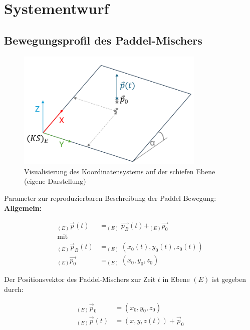 \chapter{Systementwurf}

\section{Bewegungsprofil des Paddel-Mischers}

\begin{figure}[h]
    \centering
    \includegraphics[width=0.8\textwidth]{bilder/KS_E-Koordinatensystem_Ebene.png}
    \caption[Visualisierung des Koordinatensystems auf der schiefen Ebene]{Visualisierung des Koordinatensystems auf der schiefen Ebene (eigene Darstellung)}\label{fig:VisualisierungKoordinatensystemSchiefe}
\end{figure}

Parameter zur reproduzierbaren Beschreibung der Paddel Bewegung:\\

\textbf{Allgemein:}


\begin{equation}
    \begin{aligned}
        _{(E)}\vec{p}(t) &= _{(E)}\vec{p_B}(t) + _{(E)}\vec{p_0}\\
        \text{mit}\\
        _{(E)}\vec{p}_B(t) &= _{(E)}\left(x_0(t), y_0(t), z_0(t)\right)\\
        _{(E)}\vec{p_0} &= _{(E)}\left(x_0, y_0, z_0\right)
    \end{aligned}
\end{equation}

Der Positionsvektor des Paddel-Mischers zur Zeit \( t \) in Ebene \( (E) \) ist gegeben durch:

\begin{equation}
    \begin{aligned}
        _{(E)}\vec{p}_{0} &= (x_{0}, y_{0}, z_{0})\\
        _{(E)}\vec{p}(t) &= (x, y, z(t)) + \vec{p}_{0}  
    \end{aligned} 
\end{equation}

